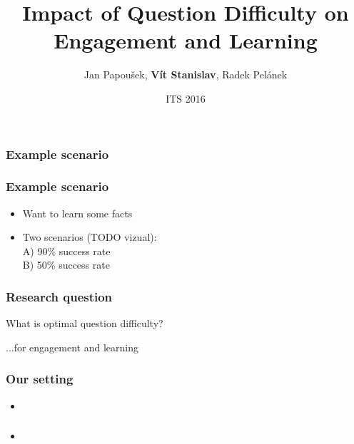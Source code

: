 \documentclass[bigger]{beamer}
\title{Impact of Question Difficulty on Engagement and Learning}
\author{Jan Papou\v{s}ek, \textbf{V\'it Stanislav}, Radek Pel\'anek \\
}
\date{ITS 2016}
\begin{document}
\frame{\titlepage}

\begin{frame}
  \frametitle{Example scenario}
	\noindent{}
\end{frame}

\begin{frame}
  \frametitle{Example scenario}
	\begin{itemize}
	  \item Want to learn some facts
		\item Two scenarios (TODO vizual): \\
		A) 90\% success rate \\
		B) 50\% success rate
	\end{itemize}
\end{frame}

\begin{frame}
  \frametitle{Research question}
	\begin{center}
    {\Huge What is optimal question difficulty?} 

		\medskip
    ...for engagement and learning
	\end{center}
\end{frame}

\begin{frame}
  \frametitle{Our setting}
	\begin{itemize}
		\item 
	\end{itemize}
\end{frame}

\begin{frame}
  \frametitle{}
	\begin{itemize}
		\item 
	\end{itemize}
\end{frame}
\end{document}
